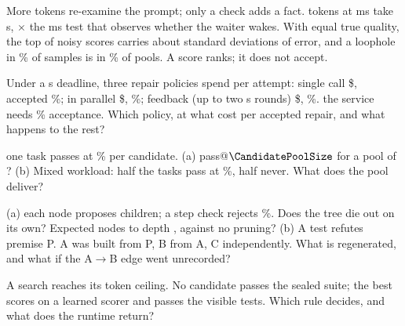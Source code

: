 \documentclass{studysheet}
\begin{document}
\begin{rightcol}
%
  {More tokens re-examine the prompt; only a check adds a fact.  tokens at  ms take  s, $\times$
   the  ms test that observes whether the waiter wakes.}{}
%
  {With equal true quality, the top of  noisy scores carries about  standard deviations of error,
   and a loophole in \% of samples is in \% of pools. A score ranks; it does not accept.}{}

\vspace{2pt}
\begin{qs}
\item Under a  s deadline, three repair policies spend per attempt: single call \$,
  accepted \%;  in parallel \$, \%; feedback (up to two  s
  rounds) \$, \%. \assumed{} the service needs \% acceptance. Which policy, at what cost
  per accepted repair, and what happens to the rest?
\item \assumed{} one task passes at \% per candidate. (a) pass@$\CandidatePoolSize$ for a pool of ?
  (b) Mixed workload: half the tasks pass at \%, half never. What does the pool deliver?
\item (a) \assumed{} each node proposes  children; a step check rejects \%. Does the tree die out on
  its own? Expected nodes to depth , against no pruning?
  (b) A test refutes premise P. A was built from P, B from A, C independently. What is regenerated,
  and what if the A$\to$B edge went unrecorded?
\item A search reaches its token ceiling. No candidate passes the sealed suite; the best scores  on a
  learned scorer and passes the visible tests. Which rule decides, and what does the runtime return?
\end{qs}
\end{rightcol}
\end{document}
